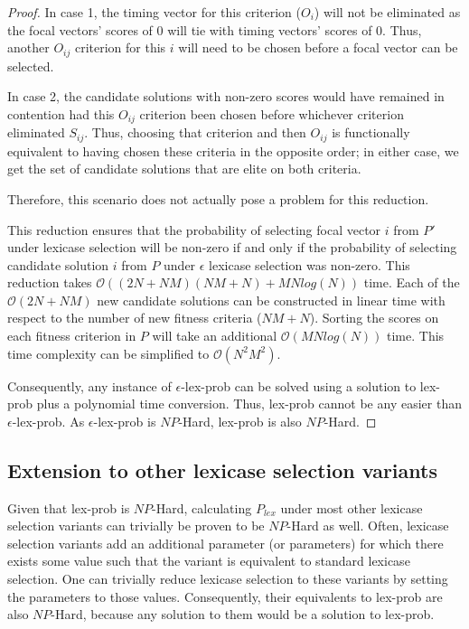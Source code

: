 \documentclass[sigconf]{acmart}
\begin{document}
\begin{proof}
In case 1, the timing vector for this criterion ($O_i$) will not be eliminated as the focal vectors' scores of 0 will tie with timing vectors' scores of 0. Thus, another $O_{ij}$ criterion for this $i$ will need to be chosen before a focal vector can be selected. 

In case 2, the candidate solutions with non-zero scores would have remained in contention had this $O_{ij}$ criterion been chosen before whichever criterion eliminated $S_{ij}$. Thus, choosing that criterion and then $O_{ij}$ is functionally equivalent to having chosen these criteria in the opposite order; in either case, we get the set of candidate solutions that are elite on both criteria.

Therefore, this scenario does not actually pose a problem for this reduction.

This reduction ensures that the probability of selecting focal vector $i$ from $P'$ under lexicase selection will be non-zero if and only if the probability of selecting candidate solution $i$ from $P$ under $\epsilon$ lexicase selection was non-zero. This reduction takes $\mathcal{O}((2N + NM)(NM + N) + MNlog(N))$ time. Each of the $\mathcal{O}(2N + NM)$ new candidate solutions can be constructed in linear time with respect to the number of new fitness criteria ($NM + N$). Sorting the scores on each fitness criterion in $P$ will take an additional $\mathcal{O}(MNlog(N))$ time. This time complexity can be simplified to $\mathcal{O}(N^2M^2)$.

Consequently, any instance of {\sc $\epsilon$-lex-prob} can be solved using a solution to {\sc lex-prob} plus a polynomial time conversion. Thus, {\sc lex-prob} cannot be any easier than {\sc $\epsilon$-lex-prob}. As {\sc $\epsilon$-lex-prob} is $NP$-Hard, {\sc lex-prob} is also $NP$-Hard.

\end{proof}

\subsection{Extension to other lexicase selection variants} 

Given that {\sc lex-prob} is $NP$-Hard, calculating $P_{lex}$ under most other lexicase selection variants can trivially be proven to be $NP$-Hard as well. Often, lexicase selection variants add an additional parameter (or parameters) for which there exists some value such that the variant is equivalent to standard lexicase selection. One can trivially reduce lexicase selection to these variants by setting the parameters to those values. Consequently, their equivalents to {\sc lex-prob} are also $NP$-Hard, because any solution to them would be a solution to {\sc lex-prob}.
\end{document}

